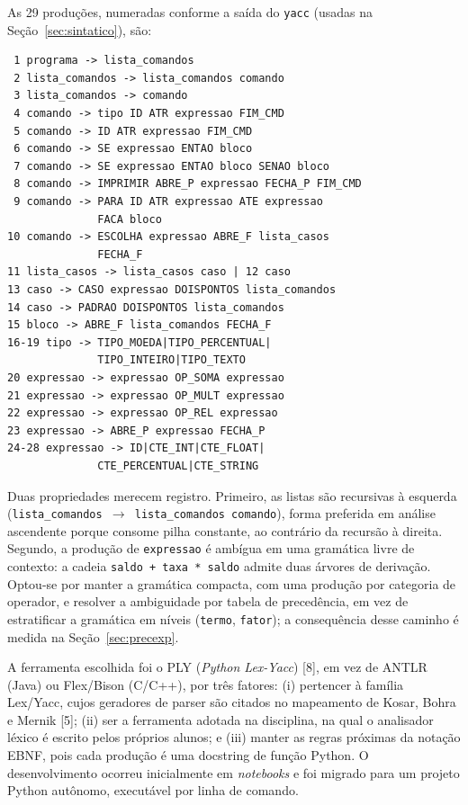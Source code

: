 \documentclass[conference]{IEEEtran}
\begin{document}
As 29 produções, numeradas conforme a saída do \texttt{yacc} (usadas na Seção~\ref{sec:sintatico}), são:
\begin{minipage}{\columnwidth}\begin{lstlisting}
 1 programa -> lista_comandos
 2 lista_comandos -> lista_comandos comando
 3 lista_comandos -> comando
 4 comando -> tipo ID ATR expressao FIM_CMD
 5 comando -> ID ATR expressao FIM_CMD
 6 comando -> SE expressao ENTAO bloco
 7 comando -> SE expressao ENTAO bloco SENAO bloco
 8 comando -> IMPRIMIR ABRE_P expressao FECHA_P FIM_CMD
 9 comando -> PARA ID ATR expressao ATE expressao
              FACA bloco
10 comando -> ESCOLHA expressao ABRE_F lista_casos
              FECHA_F
11 lista_casos -> lista_casos caso | 12 caso
13 caso -> CASO expressao DOISPONTOS lista_comandos
14 caso -> PADRAO DOISPONTOS lista_comandos
15 bloco -> ABRE_F lista_comandos FECHA_F
16-19 tipo -> TIPO_MOEDA|TIPO_PERCENTUAL|
              TIPO_INTEIRO|TIPO_TEXTO
20 expressao -> expressao OP_SOMA expressao
21 expressao -> expressao OP_MULT expressao
22 expressao -> expressao OP_REL expressao
23 expressao -> ABRE_P expressao FECHA_P
24-28 expressao -> ID|CTE_INT|CTE_FLOAT|
              CTE_PERCENTUAL|CTE_STRING
\end{lstlisting}\end{minipage}\par\smallskip

Duas propriedades merecem registro. Primeiro, as listas são recursivas à esquerda (\texttt{lista\_comandos $\rightarrow$ lista\_comandos comando}), forma preferida em análise ascendente porque consome pilha constante, ao contrário da recursão à direita. Segundo, a produção de \texttt{expressao} é ambígua em uma gramática livre de contexto: a cadeia \texttt{saldo + taxa * saldo} admite duas árvores de derivação. Optou-se por manter a gramática compacta, com uma produção por categoria de operador, e resolver a ambiguidade por tabela de precedência, em vez de estratificar a gramática em níveis (\texttt{termo}, \texttt{fator}); a consequência desse caminho é medida na Seção~\ref{sec:precexp}.

A ferramenta escolhida foi o PLY (\textit{Python Lex-Yacc}) [8], em vez de ANTLR (Java) ou Flex/Bison (C/C++), por três fatores: (i) pertencer à família Lex/Yacc, cujos geradores de parser são citados no mapeamento de Kosar, Bohra e Mernik [5]; (ii) ser a ferramenta adotada na disciplina, na qual o analisador léxico é escrito pelos próprios alunos; e (iii) manter as regras próximas da notação EBNF, pois cada produção é uma docstring de função Python. O desenvolvimento ocorreu inicialmente em \textit{notebooks} e foi migrado para um projeto Python autônomo, executável por linha de comando.
\end{document}
